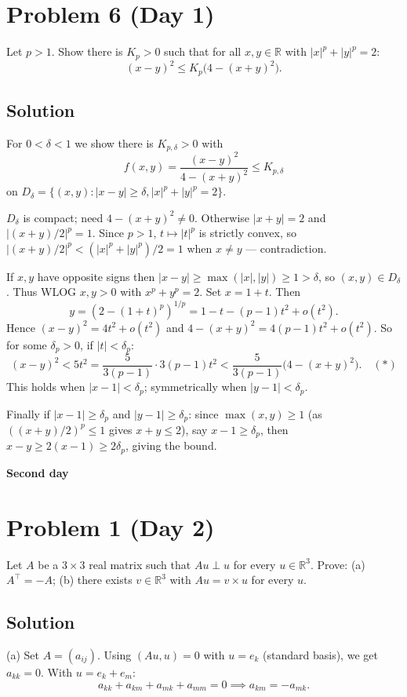 \documentclass{article}
\begin{document}
\section*{Problem 6 (Day 1)}
Let $p > 1$. Show there is $K_p > 0$ such that for all $x, y \in \mathbb{R}$ with $|x|^p + |y|^p = 2$:
\[
(x-y)^2 \leq K_p\big(4 - (x+y)^2\big).
\]

\subsection*{Solution}
For $0 < \delta < 1$ we show there is $K_{p,\delta} > 0$ with
\[
f(x,y) = \frac{(x-y)^2}{4 - (x+y)^2} \leq K_{p,\delta}
\]
on $D_\delta = \{(x,y) : |x-y| \geq \delta, |x|^p + |y|^p = 2\}$.

$D_\delta$ is compact; need $4 - (x+y)^2 \neq 0$. Otherwise $|x+y|=2$ and $|(x+y)/2|^p = 1$. Since $p > 1$, $t \mapsto |t|^p$ is strictly convex, so $|(x+y)/2|^p < (|x|^p + |y|^p)/2 = 1$ when $x \neq y$ — contradiction.

If $x, y$ have opposite signs then $|x-y| \geq \max(|x|,|y|) \geq 1 > \delta$, so $(x,y) \in D_\delta$. Thus WLOG $x, y > 0$ with $x^p + y^p = 2$. Set $x = 1 + t$. Then
\[
y = (2 - (1+t)^p)^{1/p} = 1 - t - (p-1)t^2 + o(t^2).
\]
Hence $(x-y)^2 = 4t^2 + o(t^2)$ and $4 - (x+y)^2 = 4(p-1)t^2 + o(t^2)$. So for some $\delta_p > 0$, if $|t| < \delta_p$:
\[
(x-y)^2 < 5t^2 = \frac{5}{3(p-1)} \cdot 3(p-1)t^2 < \frac{5}{3(p-1)}\big(4 - (x+y)^2\big). \quad (*)
\]
This holds when $|x - 1| < \delta_p$; symmetrically when $|y - 1| < \delta_p$.

Finally if $|x-1| \geq \delta_p$ and $|y-1| \geq \delta_p$: since $\max(x,y) \geq 1$ (as $((x+y)/2)^p \leq 1$ gives $x+y \leq 2$), say $x - 1 \geq \delta_p$, then $x - y \geq 2(x-1) \geq 2\delta_p$, giving the bound.

\begin{center}\textbf{Second day}\end{center}

\section*{Problem 1 (Day 2)}
Let $A$ be a $3\times 3$ real matrix such that $Au \perp u$ for every $u \in \mathbb{R}^3$. Prove:
(a) $A^\top = -A$;
(b) there exists $v \in \mathbb{R}^3$ with $Au = v \times u$ for every $u$.

\subsection*{Solution}
(a) Set $A = (a_{ij})$. Using $(Au, u) = 0$ with $u = e_k$ (standard basis), we get $a_{kk} = 0$. With $u = e_k + e_m$:
\[
a_{kk} + a_{km} + a_{mk} + a_{mm} = 0 \implies a_{km} = -a_{mk}.
\]
\end{document}
